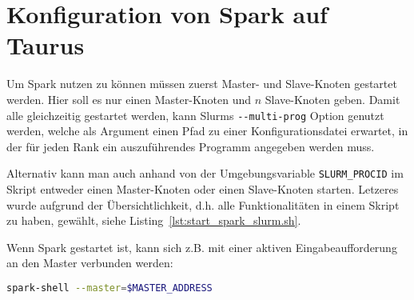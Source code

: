\section{Konfiguration von Spark auf Taurus}

Um Spark nutzen zu können müssen zuerst Master- und Slave-Knoten gestartet werden. Hier soll es nur einen Master-Knoten und $n$ Slave-Knoten geben. Damit alle gleichzeitig gestartet werden, kann Slurms \lstinline!--multi-prog! Option genutzt werden, welche als Argument einen Pfad zu einer Konfigurationsdatei erwartet, in der für jeden Rank ein auszuführendes Programm angegeben werden muss.

Alternativ kann man auch anhand von der Umgebungsvariable \lstinline!SLURM_PROCID! im Skript entweder einen Master-Knoten oder einen Slave-Knoten starten. Letzeres wurde aufgrund der Übersichtlichkeit, d.h. alle Funktionalitäten in einem Skript zu haben, gewählt, siehe Listing~\ref{lst:start_spark_slurm.sh}.

Wenn Spark gestartet ist, kann sich z.B. mit einer aktiven Eingabeaufforderung an den Master verbunden werden:
\begin{lstlisting}[language=bash]
spark-shell --master=$MASTER_ADDRESS
\end{lstlisting}\vspace{-1.5\baselineskip}
